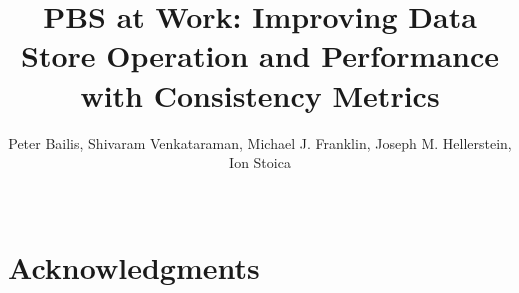 \documentclass{sig-alternate}
\begin{document}
\title{PBS at Work: Improving Data Store Operation and Performance
  with Consistency Metrics}

\author{Peter Bailis, Shivaram Venkataraman, Michael J. Franklin, Joseph M. Hellerstein, Ion Stoica\\
\\
}


\maketitle







\section{Acknowledgments}



\end{document}
